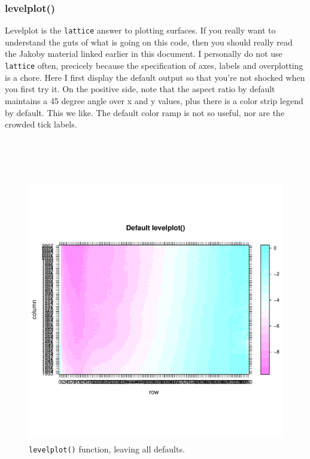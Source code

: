 \subsubsection{levelplot()}
Levelplot is the \texttt{lattice} answer to plotting surfaces. If you really want to understand the guts of what is going on this code, then you should really read the Jakoby material linked earlier in this document. I personally do not use \texttt{lattice} often, precicely because the specification of axes, labels and overplotting is a chore. Here I first display the default output so that you're not shocked when you first try it. On the positive side, note that the aspect ratio by default maintains a 45 degree angle over x and y values, plus there is a color strip legend by default. This we like. The default color ramp is not so useful, nor are the crowded tick labels.



\begin{Houtput}
\hspace*{\fill}\\
\hlstd{}\ttfamily\noindent
\hlprompt{\usebox{\hlnormalsizeboxgreaterthan}{\ }}\hlkeyword{(}\hlkeyword{)}\mbox{}
\normalfont
\hspace*{\fill}\\
\hlstd{}\ttfamily\noindent
\hlprompt{\usebox{\hlnormalsizeboxgreaterthan}{\ }}\hlkeyword{(}\hlkeyword{(}\hlkeyword{)}\hlkeyword{,}\hlargument{=}\hlkeyword{)}\mbox{}
\normalfont
\hspace*{\fill}\\
\hlstd{}
\end{Houtput}



\begin{figure}
\centering
\includegraphics[width=4.5in,height=4.5in]{figs/latticedefault.pdf}
\caption{\texttt{levelplot()} function, leaving all defaults.}
\end{figure}

